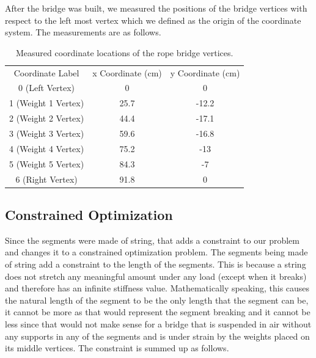 \documentclass[10pt,letterpaper,onecolumn,report]{tau-class/tau}
\begin{document}
        After the bridge was built, we measured the positions of the bridge vertices with respect to the left most vertex which we defined as the origin of the coordinate system. The measurements are as follows.
        
        \begin{table}[H]
            \centering
            \setcounter{table}{6} %
            \begin{tabular}{ccc}
                 Coordinate Label&  x Coordinate (cm)& y Coordinate (cm)\\
                 0 (Left Vertex)&  0& 0\\
                 1 (Weight 1 Vertex)&  25.7& -12.2\\
                 2 (Weight 2 Vertex)&  44.4& -17.1\\
                 3 (Weight 3 Vertex)&  59.6& -16.8\\
                 4 (Weight 4 Vertex)&  75.2& -13\\
                 5 (Weight 5 Vertex)&  84.3& -7\\
                 6 (Right Vertex)&  91.8& 0\\
            \end{tabular}
            \caption{Measured coordinate locations of the rope bridge vertices.}
            \label{tab:my_label}
        \end{table}

    \subsection{Constrained Optimization}

        Since the segments were made of string, that adds a constraint to our problem and changes it to a constrained optimization problem. The segments being made of string add a constraint to the length of the segments. This is because a string does not stretch any meaningful amount under any load (except when it breaks) and therefore has an infinite stiffness value. Mathematically speaking, this causes the natural length of the segment to be the only length that the segment can be, it cannot be more as that would represent the segment breaking and it cannot be less since that would not make sense for a bridge that is suspended in air without any supports in any of the segments and is under strain by the weights placed on its middle vertices. The constraint is summed up as follows.
\end{document}
